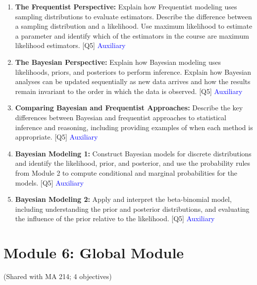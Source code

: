 \documentclass[12pt]{article}
\begin{document}

\begin{enumerate}
    \item \textbf{The Frequentist Perspective:} Explain how Frequentist modeling uses sampling distributions to evaluate estimators. Describe the difference between a sampling distribution and a likelihood. Use maximum likelihood to estimate a parameter and identify which of the estimators in the course are maximum likelihood estimators. [Q5] \textcolor{blue}{Auxiliary}
    \item \textbf{The Bayesian Perspective:} Explain how Bayesian modeling uses likelihoods, priors, and posteriors to perform inference. Explain how Bayesian analyses can be updated sequentially as new data arrives and how the results remain invariant to the order in which the data is observed. [Q5] \textcolor{blue}{Auxiliary}
    \item \textbf{Comparing Bayesian and Frequentist Approaches:} Describe the key differences between Bayesian and frequentist approaches to statistical inference and reasoning, including providing examples of when each method is appropriate. [Q5] \textcolor{blue}{Auxiliary}
    \item \textbf{Bayesian Modeling 1:} Construct Bayesian models for discrete distributions and identify the likelihood, prior, and posterior, and use the probability rules from Module 2 to compute conditional and marginal probabilities for the models. [Q5] \textcolor{blue}{Auxiliary}
    \item \textbf{Bayesian Modeling 2:} Apply and interpret the beta-binomial model, including understanding the prior and posterior distributions, and evaluating the influence of the prior relative to the likelihood. [Q5] \textcolor{blue}{Auxiliary}
\end{enumerate}

\newpage


\section{Module 6: Global Module}
(Shared with MA 214; 4 objectives)

\end{document}
